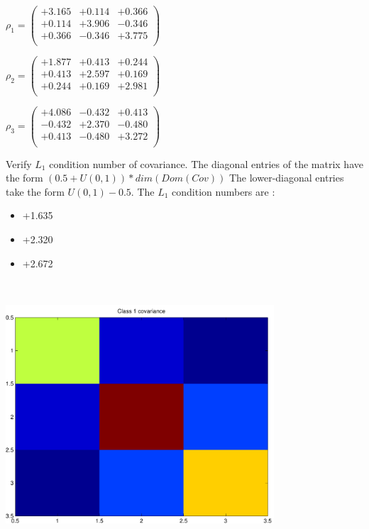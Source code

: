 \documentclass[9pt]{article}
\theoremstyle{plain}
\theoremstyle{definition}
\theoremstyle{remark}
\numberwithin{equation}{section}
\begin{document}
$\rho_1 = \left(
\begin{array}{
ccc}
+3.165 & +0.114 & +0.366 \\
+0.114 & +3.906 & -0.346 \\
+0.366 & -0.346 & +3.775 \\
\end{array}
\right)$ \newline 

$\rho_2 = \left(
\begin{array}{
ccc}
+1.877 & +0.413 & +0.244 \\
+0.413 & +2.597 & +0.169 \\
+0.244 & +0.169 & +2.981 \\
\end{array}
\right)$ \newline 

$\rho_3 = \left(
\begin{array}{
ccc}
+4.086 & -0.432 & +0.413 \\
-0.432 & +2.370 & -0.480 \\
+0.413 & -0.480 & +3.272 \\
\end{array}
\right)$ \newline 

Verify $L_1$ condition number of covariance. The diagonal entries of the matrix have the form $(0.5 + U(0,1) )*dim(Dom(Cov))$
The lower-diagonal entries take the form $U(0,1) - 0.5$. 
The $L_1$ condition numbers are :
\begin{itemize}
\item +1.635
\item +2.320
\item +2.672
\end{itemize}
\includegraphics[width=10.0cm,height=10.0cm]{rv1_corr.pdf}
\end{document}

